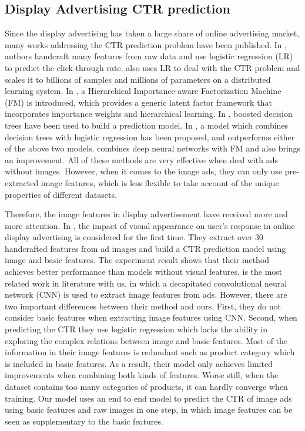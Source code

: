 \documentclass{sig-alternate-05-2015}
\begin{document}
\subsection{Display Advertising CTR prediction}
Since the display advertising has taken a large share of online advertising market, many works addressing the CTR prediction problem have been published. In \cite{richardson2007predicting,chakrabarti2008contextual}, authors handcraft many features from raw data and use logistic regression (LR) to predict the click-through rate. \cite{chapelle2014simple} also uses LR to deal with the CTR problem and scales it to
billions of samples and millions of parameters on a distributed learning system.  In \cite{oentaryo2014predicting},  a Hierarchical Importance-aware Factorization Machine (FM)  \cite{rendle2012factorization} is introduced, which provides a generic latent factor framework that incorporates importance weights and hierarchical learning. In \cite{dave2010learning}, boosted decision trees have been used to build a prediction model. In \cite{he2014practical},  a model which combines decision
trees with logistic regression has been proposed, and outperforms either of the above two models. \cite{zhang2016deep} combines deep neural networks with FM and also brings  an improvement. All of these methods are very effective when deal with ads without images. However, when it comes to the image ads, they can only use pre-extracted image features, which is less flexible to take account of the unique properties of different datasets.

Therefore, the image features in display advertisement have received more and more attention. In \cite{azimi2012impact,cheng2012multimedia}, the impact of  visual appearance  on user's response in online display advertising is considered for the first time. They extract over 30 handcrafted features from ad images and build a CTR prediction model using image and basic  features. The experiment result shows that their method achieves better performance than models without visual features.   \cite{Mo:2015:IFL:2832747.2832769} is the most related work  in literature with us, in which a decapitated convolutional neural network (CNN) is used to extract image features from ads. However, there are two important differences between their method and ours.   First, they do not consider basic features when extracting image features using CNN. Second,  when predicting the CTR they  use logistic regression which lacks the ability in exploring the complex relations between image and basic features. Most of the information in their image features is redundant  such as product category which is included in basic features. As a result, their model only achieves limited improvements when combining both kinds of features. Worse still, when the dataset contains too many categories of products, it can hardly converge when training. Our model uses an end to end model to predict the CTR of image ads using basic features and raw images in one step, in which image features can be seen as  supplementary to the basic features.
\end{document}
